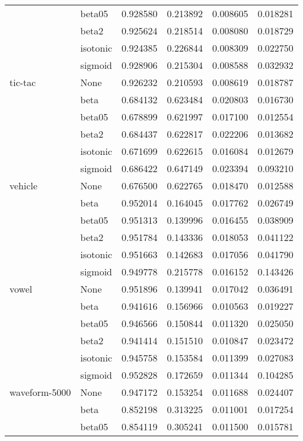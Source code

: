 \begin{tabular}{llrrrr}
        & beta05 &  0.928580 &  0.213892 &  0.008605 &  0.018281 \\
        & beta2 &  0.925624 &  0.218514 &  0.008080 &  0.018729 \\
        & isotonic &  0.924385 &  0.226844 &  0.008309 &  0.022750 \\
        & sigmoid &  0.928906 &  0.215304 &  0.008588 &  0.032932 \\
tic-tac & None &  0.926232 &  0.210593 &  0.008619 &  0.018787 \\
        & beta &  0.684132 &  0.623484 &  0.020803 &  0.016730 \\
        & beta05 &  0.678899 &  0.621997 &  0.017100 &  0.012554 \\
        & beta2 &  0.684437 &  0.622817 &  0.022206 &  0.013682 \\
        & isotonic &  0.671699 &  0.622615 &  0.016084 &  0.012679 \\
        & sigmoid &  0.686422 &  0.647149 &  0.023394 &  0.093210 \\
vehicle & None &  0.676500 &  0.622765 &  0.018470 &  0.012588 \\
        & beta &  0.952014 &  0.164045 &  0.017762 &  0.026749 \\
        & beta05 &  0.951313 &  0.139996 &  0.016455 &  0.038909 \\
        & beta2 &  0.951784 &  0.143336 &  0.018053 &  0.041122 \\
        & isotonic &  0.951663 &  0.142683 &  0.017056 &  0.041790 \\
        & sigmoid &  0.949778 &  0.215778 &  0.016152 &  0.143426 \\
vowel & None &  0.951896 &  0.139941 &  0.017042 &  0.036491 \\
        & beta &  0.941616 &  0.156966 &  0.010563 &  0.019227 \\
        & beta05 &  0.946566 &  0.150844 &  0.011320 &  0.025050 \\
        & beta2 &  0.941414 &  0.151510 &  0.010847 &  0.023472 \\
        & isotonic &  0.945758 &  0.153584 &  0.011399 &  0.027083 \\
        & sigmoid &  0.952828 &  0.172659 &  0.011344 &  0.104285 \\
waveform-5000 & None &  0.947172 &  0.153254 &  0.011688 &  0.024407 \\
        & beta &  0.852198 &  0.313225 &  0.011001 &  0.017254 \\
        & beta05 &  0.854119 &  0.305241 &  0.011500 &  0.015781 \\

\end{tabular}
